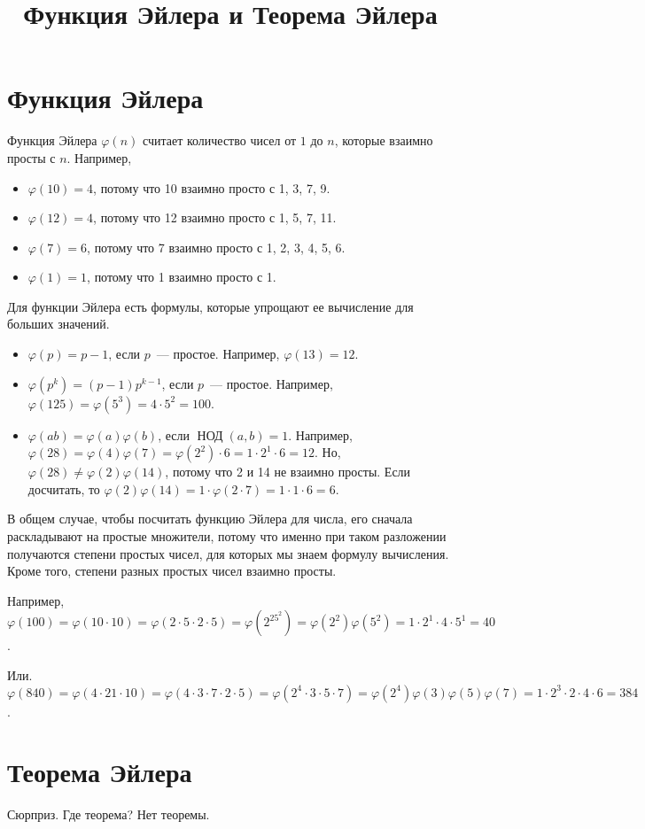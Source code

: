 \documentclass{article}
\title{Функция Эйлера и Теорема Эйлера}
\author{}
\date{}
\newcommand{\ephi}[1]{\varphi(#1)}
\begin{document}
    \maketitle

    \section{Функция Эйлера}
    Функция Эйлера $\ephi{n}$ считает количество чисел от $1$ до $n$, которые взаимно просты с $n$.
    Например,
    \begin{itemize}
        \item $\ephi{10}=4$, потому что 10 взаимно просто с 1, 3, 7, 9.
        \item $\ephi{12}=4$, потому что 12 взаимно просто с 1, 5, 7, 11.
        \item $\ephi7=6$, потому что 7 взаимно просто с 1, 2, 3, 4, 5, 6.
        \item $\ephi1=1$, потому что 1 взаимно просто с 1.
    \end{itemize}

    Для функции Эйлера есть формулы, которые упрощают ее вычисление для больших значений.

    \begin{itemize}
        \item $\ephi{p}=p-1$, если $p$~--- простое.
              Например, $\ephi{13}=12$.
        \item $\ephi{p^k}=(p-1)p^{k-1}$, если $p$~--- простое.
              Например, $\ephi{125}=\ephi{5^3}=4\cdot 5^2=100$.
        \item $\ephi{ab}=\ephi{a}\ephi{b}$, если $\mathop{\text{НОД}}(a, b)=1$.
              Например, $\ephi{28}=\ephi4\ephi7=\ephi{2^2}\cdot6=1\cdot2^1\cdot6=12$.
              Но, $\ephi{28}\ne\ephi{2}\ephi{14}$, потому что 2 и 14 не взаимно просты.
              Если досчитать, то $\ephi{2}\ephi{14}=1\cdot\ephi{2\cdot7}=1\cdot1\cdot6=6$.
    \end{itemize}

    В общем случае, чтобы посчитать функцию Эйлера для числа, его сначала раскладывают на простые множители, потому что именно при таком разложении получаются степени простых чисел, для которых мы знаем формулу вычисления. Кроме того, степени разных простых чисел взаимно просты.

    Например, $\ephi{100}=\ephi{10\cdot10}=\ephi{2\cdot5\cdot2\cdot5}=\ephi{2^25^2}=\ephi{2^2}\ephi{5^2}=
    1\cdot2^1\cdot4\cdot5^1=40$.

    Или. $\ephi{840}=\ephi{4\cdot21\cdot10}=\ephi{4\cdot3\cdot7\cdot2\cdot5}=\ephi{2^4\cdot3\cdot5\cdot7}=
    \ephi{2^4}\ephi3\ephi5\ephi7=1\cdot2^3\cdot2\cdot4\cdot6=384$.

    \section{Теорема Эйлера}
    Сюрприз.
    Где теорема?
    Нет теоремы.
\end{document}
